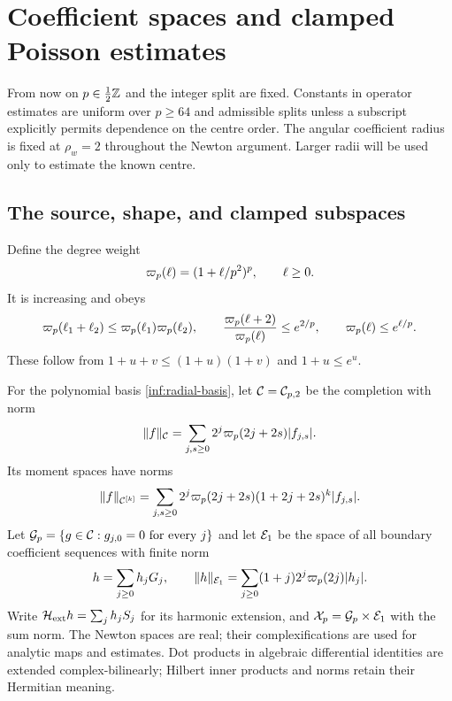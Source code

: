 \section{Coefficient spaces and clamped Poisson estimates}\label{inf:sec-spaces}

From now on $p\in\tfrac12\mathbb{Z}$ and the integer split are fixed. Constants in operator
estimates are uniform over $p\ge64$ and admissible splits unless a
subscript explicitly permits dependence on the centre order.
The angular coefficient radius is fixed at $\rho_w=2$ throughout
the Newton argument. Larger radii will be used only to estimate the
known centre.

\subsection{The source, shape, and clamped subspaces}

Define the degree weight
\begin{equation}\label{inf:degree-weight}
 \varpi_p(\ell)=(1+\ell/p^2)^p,\qquad \ell\ge0.
\end{equation}
It is increasing and obeys
\begin{equation}\label{inf:weight-properties}
 \varpi_p(\ell_1+\ell_2)\le\varpi_p(\ell_1)\varpi_p(\ell_2),\qquad
 \frac{\varpi_p(\ell+2)}{\varpi_p(\ell)}\le e^{2/p},\qquad
 \varpi_p(\ell)\le e^{\ell/p}.
\end{equation}
These follow from $1+u+v\le(1+u)(1+v)$ and $1+u\le e^u$.

\begin{definition}\label{inf:spaces}
For the polynomial basis \eqref{inf:radial-basis}, let $\mathcal C=\mathcal C_{p,2}$
be the completion with norm
\begin{equation}\label{inf:C-norm}
 \lVert f\rVert_\mathcal C=\sum_{j,s\ge0}2^j\varpi_p(2j+2s)|f_{j,s}|.
\end{equation}
Its moment spaces have norms
\begin{equation}\label{inf:C-moments}
 \lVert f\rVert_{\mathcal C^{[k]}}=
 \sum_{j,s\ge0}2^j\varpi_p(2j+2s)(1+2j+2s)^k|f_{j,s}|.
\end{equation}
Let $\mathcal{G}_p=\{g\in\mathcal C:g_{j,0}=0\text{ for every }j\}$ and let
$\mathcal E_1$ be the space of all boundary coefficient sequences with
finite norm
\begin{equation}\label{inf:E-norm}
 h=\sum_{j\ge0}h_jG_j,\qquad
 \lVert h\rVert_{\mathcal E_1}=\sum_{j\ge0}(1+j)2^j\varpi_p(2j)|h_j|.
\end{equation}
Write $\mathcal H_{\mathrm{ext}}  h=\sum_jh_jS_j$ for its harmonic extension, and
$\mathcal X_p=\mathcal{G}_p\times\mathcal E_1$ with the sum norm.
The Newton spaces are real; their complexifications are used for
analytic maps and estimates. Dot products in algebraic differential
identities are extended complex-bilinearly; Hilbert inner products
and norms retain their Hermitian meaning.
\end{definition}

